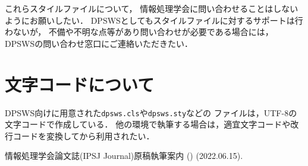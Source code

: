 \documentclass[submit,techreq,noauthor]{dpsws}
\begin{document}
これらスタイルファイルについて，
情報処理学会に問い合わせることはしないようにお願いしたい．
DPSWSとしてもスタイルファイルに対するサポートは行わないが，
不備や不明な点等があり問い合わせが必要である場合には，
DPSWSの問い合わせ窓口にご連絡いただきたい．


\section{文字コードについて}

DPSWS向けに用意された\texttt{dpsws.cls}や\texttt{dpsws.sty}などの
ファイルは，UTF-8の文字コードで作成している．
他の環境で執筆する場合は，適宜文字コードや改行コードを変換してから利用されたい．

\begin{thebibliography}{10}

情報処理学会論文誌(IPSJ Journal)原稿執筆案内
()
(2022.06.15).

\end{thebibliography}
\end{document}
